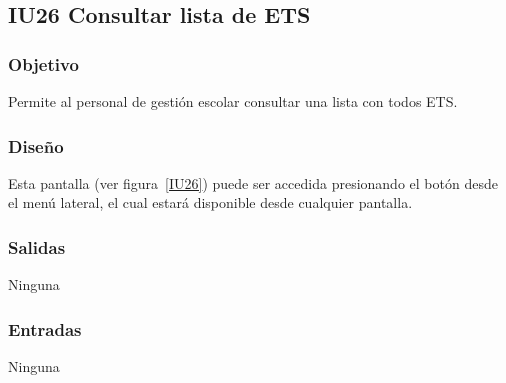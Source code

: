 
\subsection{IU26 Consultar lista de ETS}
\subsubsection{Objetivo}
    Permite al personal de gestión escolar consultar una lista con todos ETS.
\subsubsection{Diseño}
    Esta pantalla  (ver figura~\ref{IU26}) puede ser accedida presionando el botón  desde el menú lateral, el cual estará disponible desde cualquier pantalla.
     

\subsubsection{Salidas}
Ninguna
\subsubsection{Entradas}
Ninguna
